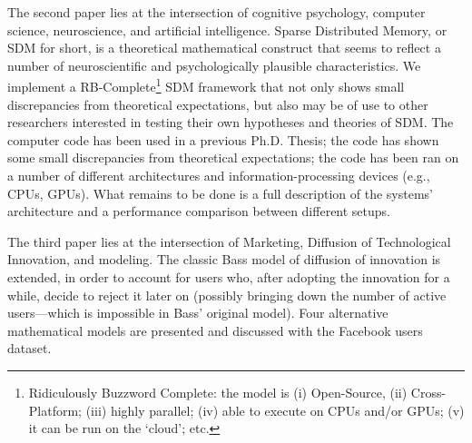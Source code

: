 The second paper lies at the intersection of cognitive psychology, computer science, neuroscience, and artificial intelligence.  Sparse Distributed Memory, or SDM for short, is a theoretical mathematical construct that seems to reflect a number of neuroscientific and psychologically plausible characteristics. We implement a RB-Complete\footnote{Ridiculously Buzzword Complete: the model is (i) Open-Source, (ii) Cross-Platform; (iii) highly parallel; (iv) able to execute on CPUs and/or GPUs; (v) it can be run on the `cloud'; etc.} SDM framework that not only shows small discrepancies from theoretical expectations, but also may be of use to other researchers interested in testing their own hypotheses and theories of SDM. The computer code has been used in a previous Ph.D. Thesis; the code has shown some small discrepancies from theoretical expectations; the code has been ran on a number of different architectures and information-processing devices (e.g., CPUs, GPUs).  What remains to be done is a full description of the systems' architecture and a performance comparison between different setups.

The third paper lies at the intersection of Marketing, Diffusion of Technological Innovation, and modeling. The classic Bass model of diffusion of innovation is extended, in order to account for users who, after adopting the innovation for a while, decide to reject it later on (possibly bringing down the number of active users---which is impossible in Bass' original model). Four alternative mathematical models are presented and discussed with the Facebook users dataset. %


